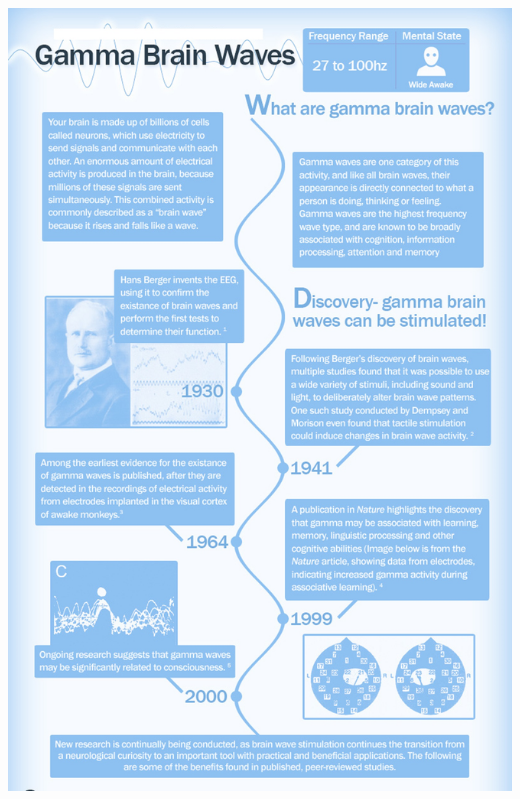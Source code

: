 \documentclass[10pt]{article}
\begin{document}
\begin{center}
	\graphicspath{ {images/} }
	\includegraphics[width=16cm, height=23cm]{Gamma_waves}
\end{center}
\end{document}
